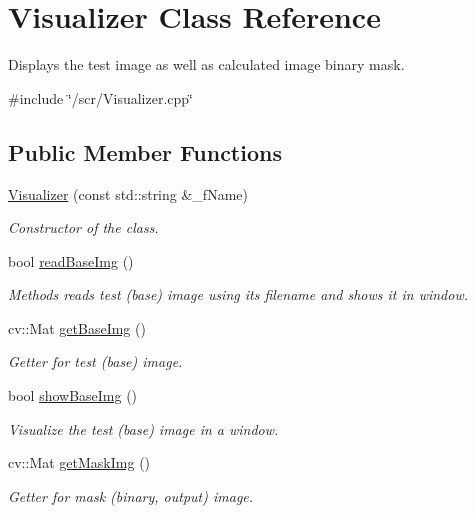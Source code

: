 \hypertarget{class_visualizer}{}\section{Visualizer Class Reference}
\label{class_visualizer}


Displays the test image as well as calculated image binary mask.  




{\ttfamily \#include \char`\"{}/scr/\+Visualizer.\+cpp\char`\"{}}

\subsection*{Public Member Functions}
\begin{DoxyCompactItemize}
\item 
\mbox{\hyperlink{class_visualizer_a99f4d8a99e88e67c69060df5a105948e}{Visualizer}} (const std\+::string \&\+\_\+f\+Name)
\begin{DoxyCompactList}\small\item\em Constructor of the class. \end{DoxyCompactList}\item 
bool \mbox{\hyperlink{class_visualizer_ac41cc9dbf7c06e138dc81ebe62c233ad}{read\+Base\+Img}} ()
\begin{DoxyCompactList}\small\item\em Methods reads test (base) image using its filename and shows it in window. \end{DoxyCompactList}\item 
cv\+::\+Mat \mbox{\hyperlink{class_visualizer_a93211a160c72d44453133c91b1495b15}{get\+Base\+Img}} ()
\begin{DoxyCompactList}\small\item\em Getter for test (base) image. \end{DoxyCompactList}\item 
bool \mbox{\hyperlink{class_visualizer_a9bc45fad9eed11417648dc2aa45b0ed3}{show\+Base\+Img}} ()
\begin{DoxyCompactList}\small\item\em Visualize the test (base) image in a window. \end{DoxyCompactList}\item 
cv\+::\+Mat \mbox{\hyperlink{class_visualizer_a0bed72124e97396cbcf6bd76feacfa3e}{get\+Mask\+Img}} ()
\begin{DoxyCompactList}\small\item\em Getter for mask (binary, output) image. \end{DoxyCompactList}\item 

\end{DoxyCompactItemize}
